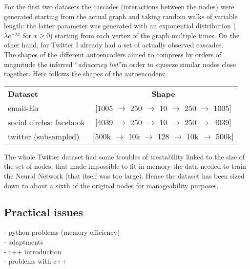 \documentclass{article}
\begin{document}
				\bigskip
				For the first two datasets the cascades (interactions between the nodes) were generated starting from the actual graph and taking random walks of variable length: the latter parameter was generated with an exponential distribution ($\lambda e^{-\lambda x}$ for $x\ge 0$) starting from each vertex of the graph multiple times. On the other hand, for Twitter I already had a set of actually observed cascades.\smallskip\\
				The shapes of the different autoencoders aimed to compress by orders of magnitude the inferred \textquotedblleft \textit{adjacency list}\textquotedblright in order to squeeze similar nodes close together. Here follows the shapes of the autoencoders:
				\begin{center}
					\begin{tabular}{l | c}
						\textbf{Dataset} & \textbf{Shape} \\
						email-Eu & [1005 $\rightarrow$ 250 $\rightarrow$ 10 $\rightarrow$ 250 $\rightarrow$ 1005] \\
						social circles: facebook & [4039 $\rightarrow$ 250 $\rightarrow$ 10 $\rightarrow$ 250 $\rightarrow$ 4039]  \\
						twitter (subsampled) & [500k $\rightarrow$ 10k $\rightarrow$ 128 $\rightarrow$ 10k $\rightarrow$ 500k]
					\end{tabular}	
				\end{center}
				The whole Twitter dataset had some troubles of treatability linked to the size of the set of nodes, that made impossible to fit in memory the data needed to train the Neural Network (that itself was too large). Hence the dataset has been sized down to about a sixth of the original nodes for manageability purposes.
				\newpage
			\subsection{Practical issues}
			- python problems (memory efficiency)\\
			- adaptments\\
			- c++ introduction\\
			- problems with c++\\
			
\end{document}
